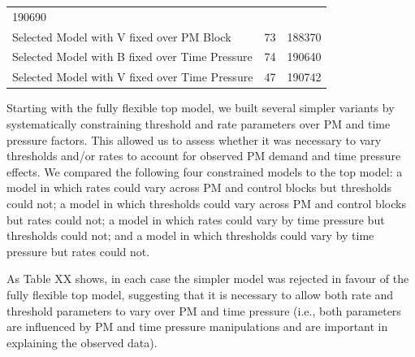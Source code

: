 \documentclass[11pt,]{article}
\begin{document}
\begin{longtable}[]{@{}lcc@{}}
\begin{minipage}[t]{0.08\columnwidth}
190690\strut
\end{minipage}\tabularnewline
\begin{minipage}[t]{0.35\columnwidth}\raggedright\strut
Selected Model with V fixed over PM Block\strut
\end{minipage} & \begin{minipage}[t]{0.19\columnwidth}\centering\strut
73\strut
\end{minipage} & \begin{minipage}[t]{0.08\columnwidth}\centering\strut
188370\strut
\end{minipage}\tabularnewline
\begin{minipage}[t]{0.35\columnwidth}\raggedright\strut
Selected Model with B fixed over Time Pressure\strut
\end{minipage} & \begin{minipage}[t]{0.19\columnwidth}\centering\strut
74\strut
\end{minipage} & \begin{minipage}[t]{0.08\columnwidth}\centering\strut
190640\strut
\end{minipage}\tabularnewline
\begin{minipage}[t]{0.35\columnwidth}\raggedright\strut
Selected Model with V fixed over Time Pressure\strut
\end{minipage} & \begin{minipage}[t]{0.19\columnwidth}\centering\strut
47\strut
\end{minipage} & \begin{minipage}[t]{0.08\columnwidth}\centering\strut
190742\strut
\end{minipage}\tabularnewline
\bottomrule
\end{longtable}

Starting with the fully flexible top model, we built several simpler
variants by systematically constraining threshold and rate parameters
over PM and time pressure factors. This allowed us to assess whether it
was necessary to vary thresholds and/or rates to account for observed PM
demand and time pressure effects. We compared the following four
constrained models to the top model: a model in which rates could vary
across PM and control blocks but thresholds could not; a model in which
thresholds could vary across PM and control blocks but rates could not;
a model in which rates could vary by time pressure but thresholds could
not; and a model in which thresholds could vary by time pressure but
rates could not.

As Table XX shows, in each case the simpler model was rejected in favour
of the fully flexible top model, suggesting that it is necessary to
allow both rate and threshold parameters to vary over PM and time
pressure (i.e., both parameters are influenced by PM and time pressure
manipulations and are important in explaining the observed data).
\end{document}
